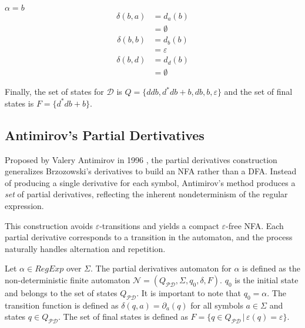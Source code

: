 \medspace $\alpha = b$
\begin{align*}
	\delta(b, a) &= d_a(b) \\
	&= \emptyset
\end{align*}
\begin{align*}
	\delta(b, b) &= d_b(b) \\
	&= \varepsilon
\end{align*}
\begin{align*}
	\delta(b, d) &= d_d(b) \\
	&= \emptyset
\end{align*}

Finally, the set of states for $\mathcal{D}$ is $Q = \{ ddb, d^*db + b, db, b, \varepsilon \}$ and the set of final states is $F = \{ d^*db + b \}$.




\subsection{Antimirov's Partial Dertivatives}
Proposed by Valery Antimirov in 1996 \cite{pdregex_antimirov}, the partial derivatives construction generalizes Brzozowski's derivatives to build an NFA rather than a DFA. Instead of producing a single derivative for each symbol, Antimirov's method produces a \emph{set} of partial derivatives, reflecting the inherent nondeterminism of the regular expression.

This construction avoids $\varepsilon$-transitions and yields a compact $\varepsilon$-free NFA. Each partial derivative corresponds to a transition in the automaton, and the process naturally handles alternation and repetition.

\begin{defn}
	Let $\alpha \in RegExp$ over $\Sigma$. The partial derivatives automaton for $\alpha$ is defined as the non-deterministic finite automaton $\mathcal{N} = (Q_{\mathcal{PD}}, \Sigma, q_0, \delta, F)$. $q_0$ is the initial state and belongs to the set of states $Q_{\mathcal{PD}}$. It is important to note that $q_0 = \alpha$. The transition function is defined as $\delta(q,a) = \partial_a(q)$ for all symbols $a \in \Sigma$ and states $q \in Q_{\mathcal{PD}}$. The set of final states is defined as $F = \{ q \in Q_{\mathcal{PD}} \, | \, \varepsilon(q) = \varepsilon \}$.
\end{defn}

